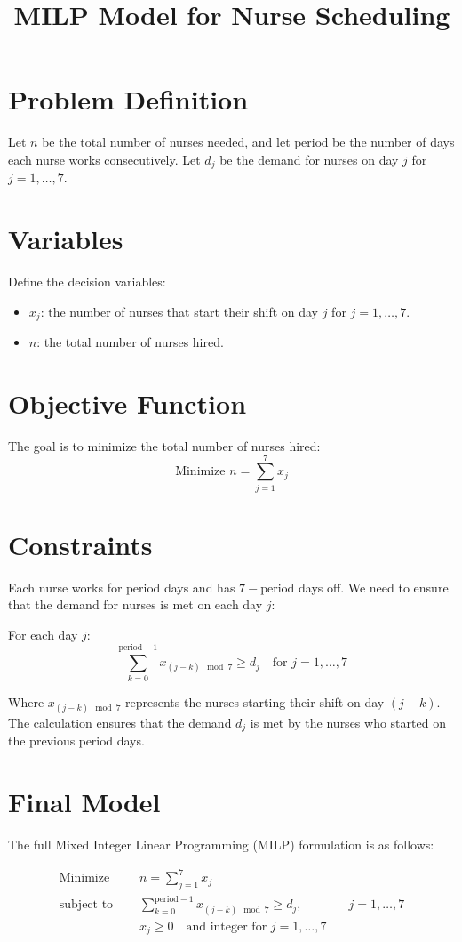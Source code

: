 \documentclass{article}
\begin{document}
\title{MILP Model for Nurse Scheduling}
\author{}
\date{}
\maketitle

\section*{Problem Definition}
Let \( n \) be the total number of nurses needed, and let \( \text{period} \) be the number of days each nurse works consecutively. Let \( d_j \) be the demand for nurses on day \( j \) for \( j = 1, \ldots, 7 \).

\section*{Variables}
Define the decision variables:
\begin{itemize}
    \item \( x_j \): the number of nurses that start their shift on day \( j \) for \( j = 1, \ldots, 7 \).
    \item \( n \): the total number of nurses hired.
\end{itemize}

\section*{Objective Function}
The goal is to minimize the total number of nurses hired:
\[
\text{Minimize } n = \sum_{j=1}^{7} x_j
\]

\section*{Constraints}
Each nurse works for \( \text{period} \) days and has \( 7 - \text{period} \) days off. We need to ensure that the demand for nurses is met on each day \( j \):

For each day \( j \):
\[
\sum_{k=0}^{\text{period}-1} x_{(j-k) \mod 7} \geq d_j \quad \text{for } j = 1, \ldots, 7
\]

Where \( x_{(j-k) \mod 7} \) represents the nurses starting their shift on day \( (j-k) \). The calculation ensures that the demand \( d_j \) is met by the nurses who started on the previous \( \text{period} \) days.

\section*{Final Model}
The full Mixed Integer Linear Programming (MILP) formulation is as follows:

\begin{align*}
\text{Minimize } & \quad n = \sum_{j=1}^{7} x_j \\
\text{subject to } & \quad \sum_{k=0}^{\text{period}-1} x_{(j-k) \mod 7} \geq d_j, & \quad j = 1, \ldots, 7 \\
& \quad x_j \geq 0 \quad \text{and integer for } j = 1, \ldots, 7
\end{align*}
\end{document}
